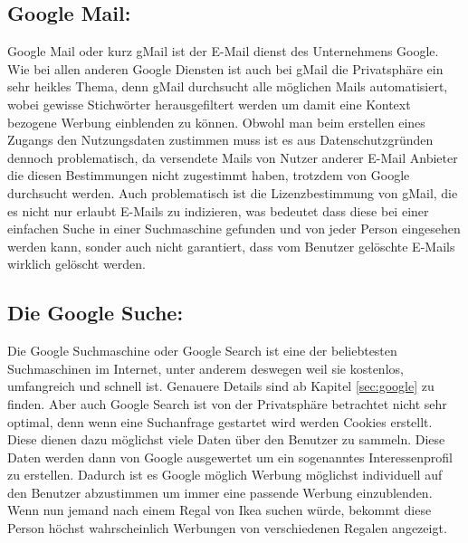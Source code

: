 \documentclass[12pt, a4paper]{llncs}
\begin{document}
	\subsection{Google Mail:}
	Google Mail oder kurz gMail ist der E-Mail dienst des Unternehmens Google. Wie bei allen anderen Google Diensten ist auch bei gMail die Privatsphäre ein sehr heikles Thema, denn gMail durchsucht alle möglichen Mails automatisiert, wobei gewisse Stichwörter herausgefiltert werden um damit eine Kontext bezogene Werbung einblenden zu können. Obwohl man beim erstellen eines Zugangs den Nutzungsdaten zustimmen muss ist es aus Datenschutzgründen dennoch problematisch, da versendete Mails von Nutzer anderer E-Mail Anbieter die diesen Bestimmungen nicht zugestimmt haben, trotzdem von Google durchsucht werden. Auch problematisch ist die Lizenzbestimmung von gMail, die es nicht nur erlaubt E-Mails zu indizieren, was bedeutet dass diese bei einer einfachen Suche in einer Suchmaschine gefunden und von jeder Person eingesehen werden kann, sonder auch nicht garantiert, dass vom Benutzer gelöschte E-Mails wirklich gelöscht werden.
	\\
	\subsection{Die Google Suche:}
	\label{sec:search}
	Die Google Suchmaschine oder Google Search ist eine der beliebtesten Suchmaschinen im Internet, unter anderem deswegen weil sie kostenlos, umfangreich und schnell ist. Genauere Details sind ab Kapitel \ref{sec:google} zu finden. Aber auch Google Search ist von der Privatsphäre betrachtet nicht sehr optimal, denn wenn eine Suchanfrage gestartet wird werden Cookies erstellt. Diese dienen dazu möglichst viele Daten über den Benutzer zu sammeln. Diese Daten werden dann von Google ausgewertet um ein sogenanntes Interessenprofil zu erstellen. Dadurch ist es Google möglich Werbung möglichst individuell auf den Benutzer abzustimmen um immer eine passende Werbung einzublenden. Wenn nun jemand nach einem Regal von Ikea suchen würde, bekommt diese Person höchst wahrscheinlich Werbungen von verschiedenen Regalen angezeigt.
\end{document}

